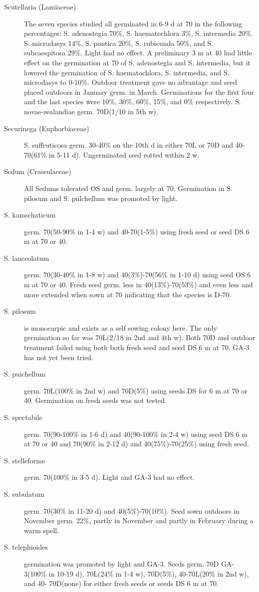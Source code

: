 \begin{description}
\item[Scutellaria (Lamiaceae)] The seven species studied all germinated in 6-9
d at 70 in the following percentages: S. adenostegia 70\%, S. haematochlora 3\%, S.
intermedia 20\%. S. microdasys 14\%, S. pontica 20\%, S. rubicunda 50\%, and S.
subcaespitosa 29\%. Light had no effect. A preliminary 3 m at 40 had little effect on
the germination at 70 of S. adenostegia and S. intermedia, but it lowered the
germination of S. haematochlora, S. intermedia, and S. microdasys to 0-10\%.
Outdoor treatment gave no advantage and seed placed outdoors in January germ. in
March. Germinations for the first four and the last species were 10\%, 30\%, 60\%, 15\%,
and 0\% respectively. S. novae-zealandiae germ. 70D(1/10 in 5th w).
\item[Securinega (Euphorbiaceae)] S. suffruticosa germ. 30-40\% on the 10th d
in either 70L or 70D and 40-70(61\% in 5-11 d). Ungerminated seed rotted within 2 w.

\item[Sedum (Crassulaceae)] All Sedums tolerated OS and germ. largely at 70.
Germination in S. pilosum and S. pulchellum was promoted by light.
\item[S. kamschaticum] germ. 70(50-90\% in 1-4 w) and 40-70(1-5\%) using fresh
seed or seed DS 6 m at 70 or 40.
\item[S. lanceolatum] germ. 70(30-40\% in 1-8 w) and 40(3\%)-70(56\% in 1-10 d) using
seed OS 6 m at 70 or 40. Fresh seed germ. less in 40(13\%)-70(53\%) and even less
and more extended when sown at 70 indicating that the species is D-70.
\item[S. pilosum] is monocarpic and exists as a self sowing colony here. The only
germination so far was 70L(2/18 in 2nd and 4th w). Both 70D and outdoor treatment
failed using both both fresh seed and seed DS 6 m at 70. GA-3 has not yet been tried.
\item[S. puichellum] germ. 70L(100\% in 2nd w) and 70D(5\%) using seeds DS for 6 m
at 70 or 40. Germination on fresh seeds was not tested.
\item[S. spectabile] germ. 70(90-100\% in 1-6 d) and 40(90-100\% in 2-4 w) using seed
DS 6 m at 70 or 40 and 70(90\% in 2-12 d) and 40(75\%)-70(25\%) using fresh seed.
\item[S. stelleforme] germ. 70(100\% in 3-5 d). Light and GA-3 had no effect.
\item[S. subulatum] germ. 70(30\% in 11-20 d) and 40(5\%)-70(10\%). Seed sown
outdoors in November germ. 22\%, partly in November and partly in February during a
warm spell.
\item[S. telephioides] germination was promoted by light and GA-3. Seeds germ. 70D
GA-3(100\% in 10-19 d), 70L(24\% in 1-4 w), 70D(5\%), 40-70L(20\% in 2nd w), and 40-
70D(none) for either fresh seeds or seeds DS 6 m at 70.


\end{description}
